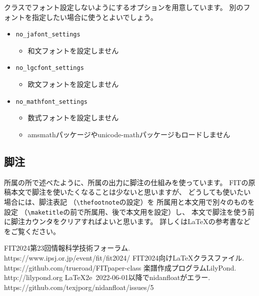 \documentclass{FITpaper}
\begin{document}
クラスでフォント設定しないようにするオプションを用意しています。
別のフォントを指定したい場合に使うとよいでしょう。

\begin{itemize}
\item \texttt{no\_jafont\_settings}
  \begin{itemize}
  \item 和文フォントを設定しません
  \end{itemize}
\item \texttt{no\_lgcfont\_settings}
  \begin{itemize}
  \item 欧文フォントを設定しません
  \end{itemize}
\item \texttt{no\_mathfont\_settings}
  \begin{itemize}
  \item 数式フォントを設定しません
  \item amsmathパッケージやunicode-mathパッケージもロードしません
  \end{itemize}
\end{itemize}

\subsection{脚注}

所属の所で述べたように、所属の出力に脚注の仕組みを使っています。
FITの原稿本文で脚注を使いたくなることは少ないと思いますが、
どうしても使いたい場合には、脚注表記
（\texttt{\textbackslash thefootnote}の設定）を
所属用と本文用で別々のものを設定
（\texttt{\textbackslash maketitle}の前で所属用、後で本文用を設定）し、
本文で脚注を使う前に脚注カウンタをクリアすればよいと思います。
詳しくは\LaTeX の参考書などをご覧ください。


\begin{thebibliography}{9}

  FIT2024第23回情報科学技術フォーラム. \\
  https://www.ipsj.or.jp/event/fit/fit2024/
  FIT2024向け\LaTeX クラスファイル. \\
  https://github.com/trueroad/FITpaper-class
  楽譜作成プログラムLilyPond. \\
  http://lilypond.org
  \LaTeX2e~2022-06-01以降でnidanfloatがエラー. \\
  https://github.com/texjporg/nidanfloat/issues/5

\end{thebibliography}
\end{document}
